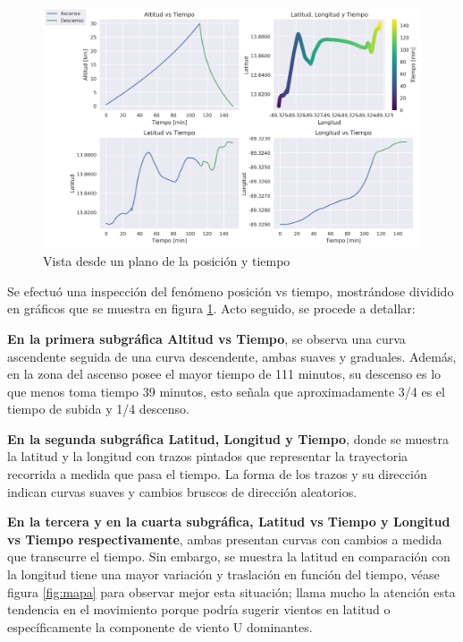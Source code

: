\newpage

\begin{figure}[ht]
    \centering
    \includegraphics[width=0.93\linewidth]{document/figures/03_plano_posicion_vs_tiempo.png}
    \caption{Vista desde un plano de la posición y tiempo}
    \label{fig:posicion_vs_tiempo}
\end{figure}

Se efectuó una inspección del fenómeno posición vs tiempo, mostrándose  dividido en gráficos que se muestra en figura \ref{fig:posicion_vs_tiempo}. Acto seguido, se procede a detallar: 

\textbf{En la primera subgráfica Altitud vs Tiempo},  se observa una curva ascendente seguida de una curva descendente, ambas suaves y graduales. Además, en la zona del ascenso posee  el mayor tiempo  de 111 minutos, su descenso es lo que menos toma tiempo 39 minutos,  esto señala que aproximadamente 3/4  es el tiempo de subida y 1/4 descenso.

\textbf{En la segunda subgráfica Latitud, Longitud y Tiempo}, donde se muestra la latitud y la longitud con trazos pintados que representar la trayectoria recorrida a medida que pasa el tiempo. La forma de los trazos y su dirección indican curvas suaves y  cambios bruscos de dirección aleatorios.

\textbf{En la tercera y en la cuarta subgráfica, Latitud vs Tiempo y Longitud vs Tiempo respectivamente}, ambas presentan curvas con cambios a medida que transcurre el tiempo. Sin embargo, se muestra la latitud en comparación con la longitud tiene una mayor variación y traslación en función del tiempo, véase figura \ref{fig:mapa} para observar mejor esta situación; llama mucho la atención esta tendencia en el movimiento porque podría sugerir vientos en latitud o específicamente la componente de viento U dominantes.

